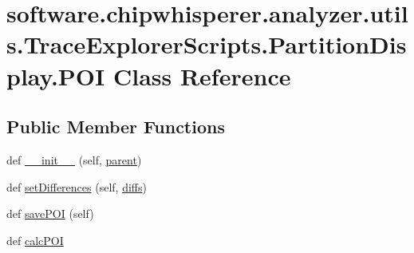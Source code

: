 \hypertarget{classsoftware_1_1chipwhisperer_1_1analyzer_1_1utils_1_1TraceExplorerScripts_1_1PartitionDisplay_1_1POI}{}\section{software.\+chipwhisperer.\+analyzer.\+utils.\+Trace\+Explorer\+Scripts.\+Partition\+Display.\+P\+O\+I Class Reference}
\label{classsoftware_1_1chipwhisperer_1_1analyzer_1_1utils_1_1TraceExplorerScripts_1_1PartitionDisplay_1_1POI}
\subsection*{Public Member Functions}
\begin{DoxyCompactItemize}
\item 
def \hyperlink{classsoftware_1_1chipwhisperer_1_1analyzer_1_1utils_1_1TraceExplorerScripts_1_1PartitionDisplay_1_1POI_afc94ebe517ab338a82b581c7036c7ffa}{\+\_\+\+\_\+init\+\_\+\+\_\+} (self, \hyperlink{classsoftware_1_1chipwhisperer_1_1analyzer_1_1utils_1_1TraceExplorerScripts_1_1PartitionDisplay_1_1POI_a5365ab9885cd9f79ca294ebd0a48fdda}{parent})
\item 
def \hyperlink{classsoftware_1_1chipwhisperer_1_1analyzer_1_1utils_1_1TraceExplorerScripts_1_1PartitionDisplay_1_1POI_a4547beeeea7a868c95d44311d054dfcb}{set\+Differences} (self, \hyperlink{classsoftware_1_1chipwhisperer_1_1analyzer_1_1utils_1_1TraceExplorerScripts_1_1PartitionDisplay_1_1POI_a82aa66ff95bc2a0a00bf0462ccb813d6}{diffs})
\item 
def \hyperlink{classsoftware_1_1chipwhisperer_1_1analyzer_1_1utils_1_1TraceExplorerScripts_1_1PartitionDisplay_1_1POI_ad546799627b06ad46316556fa62713eb}{save\+P\+O\+I} (self)
\item 
def \hyperlink{classsoftware_1_1chipwhisperer_1_1analyzer_1_1utils_1_1TraceExplorerScripts_1_1PartitionDisplay_1_1POI_ae8c81958a7b5ef2e7f018b280b7d0b25}{calc\+P\+O\+I}
\end{DoxyCompactItemize}
